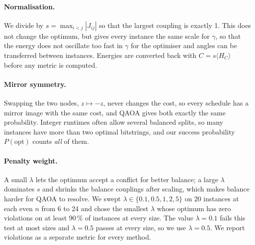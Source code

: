 \paragraph{Normalisation.}
\label{sec:normalisation}
We divide by $s = \max_{i<j} |J_{ij}|$ so that the largest coupling is exactly 1.
This does not change the optimum, but gives every instance the same scale for $\gamma$, so that the energy does not oscillate too fast in $\gamma$ for the optimiser and angles can be transferred between instances.
Energies are converted back with $C = s \langle H_C \rangle$ before any metric is computed.

\paragraph{Mirror symmetry.}
\label{sec:symmetry}
Swapping the two nodes, $z \mapsto -z$, never changes the cost, so every schedule has a mirror image with the same cost, and QAOA gives both exactly the same probability.
Integer runtimes often allow several balanced splits, so many instances have more than two optimal bitstrings, and our success probability $P(\text{opt})$ counts \emph{all} of them.

\paragraph{Penalty weight.}
\label{sec:lambda}
A small $\lambda$ lets the optimum accept a conflict for better balance; a large $\lambda$ dominates $s$ and shrinks the balance couplings after scaling, which makes balance harder for QAOA to resolve.
We swept $\lambda \in \{0.1, 0.5, 1, 2, 5\}$ on 20 instances at each even $n$ from 6 to 24 and chose the smallest $\lambda$ whose optimum has zero violations on at least 90\,\% of instances at every size.
The value $\lambda = 0.1$ fails this test at most sizes and $\lambda = 0.5$ passes at every size, so we use $\lambda = 0.5$.
We report violations as a separate metric for every method.
